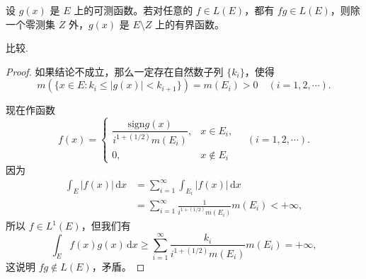\documentclass[../../main.tex]{subfiles}
\begin{document}
\begin{proposition}
设 $g(x)$ 是 $E$ 上的可测函数。若对任意的 $f \in L(E)$，都有 $fg \in L(E)$，则除一个零测集 $Z$ 外，$g(x)$ 是 $E \setminus Z$ 上的有界函数。
\end{proposition}
\begin{remark}
比较.
\end{remark}
\begin{proof}
如果结论不成立，那么一定存在自然数子列 $\{ k_i \}$，使得
\[
m(\{ x \in E : k_i \leqslant |g(x)| < k_{i+1} \}) = m(E_i) > 0 \quad (i = 1, 2, \cdots).
\]

现在作函数
\[
f(x) = 
\begin{cases} 
\dfrac{\text{sign}g(x)}{i^{1 + (1/2)} m(E_i)}, & x \in E_i, \\
0, & x \notin E_i 
\end{cases} \quad (i = 1, 2, \cdots).
\]
因为
\begin{align*}
\int_E |f(x)| \, \mathrm{d}x &= \sum_{i=1}^{\infty} \int_{E_i} |f(x)| \, \mathrm{d}x \\
&= \sum_{i=1}^{\infty} \frac{1}{i^{1 + (1/2)} m(E_i)} m(E_i) < +\infty,
\end{align*}
所以 $f \in L^1(E)$，但我们有
\[
\int_E f(x)g(x) \, \mathrm{d}x \geqslant \sum_{i=1}^{\infty} \frac{k_i}{i^{1 + (1/2)} m(E_i)} m(E_i) = +\infty,
\]
这说明 $fg \notin L(E)$，矛盾。

\end{proof}
\end{document}
